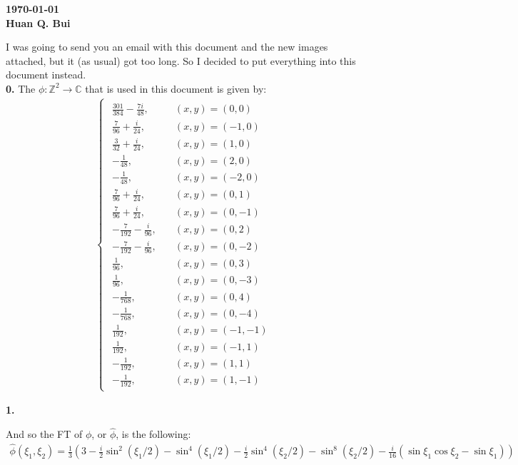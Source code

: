 \documentclass{article}
\theoremstyle{definition}
\newcommand{\f}[2]{\frac{#1}{#2}}
\newcommand{\lp}{\left(}
\newcommand{\rp}{\right)}
\begin{document}
\begin{center}
	\textbf{\today}\\
	\textbf{Huan Q. Bui}
\end{center}


I was going to send you an email with this document and the new images attached, but it (as usual) got too long. So I decided to put everything into this document instead.  \\


\noindent \textbf{0.} The $\phi : \mathbb{Z}^2 \to \mathbb{C}$ that is used in this document is given by:
\begin{align}
\begin{cases}
\begin{alignedat}{2}
\f{301}{384} - \f{7i}{48}, &\quad (x,y) = (0,0)\\[10pt]
\f{7}{96} + \f{i}{24},& \quad (x,y) = (-1,0)\\[10pt]
\f{3}{32} + \f{i}{24},& \quad (x,y) = (1,0)\\[10pt]
-\f{1}{48}, &\quad (x,y) = (2,0)\\[10pt]
-\f{1}{48}, &\quad (x,y) = (-2,0)\\[10pt]
\f{7}{96} + \f{i}{24}, &\quad (x,y) = (0,1)\\[10pt]
\f{7}{96} + \f{i}{24}, &\quad (x,y) = (0,-1)\\[10pt]
-\f{7}{192} - \f{i}{96}, &\quad (x,y) = (0,2)\\[10pt]
-\f{7}{192} - \f{i}{96}, &\quad (x,y) = (0,-2)\\[10pt]
\f{1}{96}, &\quad (x,y) = (0,3)\\[10pt]
\f{1}{96}, &\quad (x,y) = (0,-3)\\[10pt]
-\f{1}{768}, &\quad (x,y) = (0,4)\\[10pt]
-\f{1}{768}, &\quad (x,y) = (0,-4)\\[10pt]
\f{1}{192}, &\quad (x,y) = (-1,-1)\\[10pt]
\f{1}{192}, &\quad (x,y) = (-1,1)\\[10pt]
-\f{1}{192}, &\quad (x,y) = (1,1)\\[10pt]
-\f{1}{192}, &\quad (x,y) = (1,-1)
\end{alignedat}
\end{cases}
\end{align}


\newpage



\noindent \textbf{1.}  


And so the FT of $\phi$, or $\hat\phi$, is the following: 
\begin{align}
\boxed{\hat{\phi}(\xi_1,\xi_2) =   \f{1}{3} \lp 3 - \f{i}{2}\sin^2(\xi_1/2) - \sin^4(\xi_1/2) - \f{i}{2}\sin^4(\xi_2/2) - \sin^8(\xi_2/2) - \f{i}{16}(\sin \xi_1 \cos \xi_2 - \sin \xi_1) \rp}
\end{align}
\end{document}
